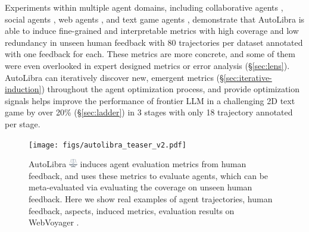 Experiments within multiple agent domains, including collaborative agents \citep{shao2024collaborative},
social agents \citep{zhousotopia}, web agents \citep{zhouwebarena,he2024webvoyager},
and text game agents \citep{paglieri2024balrog,cloos2024babaaibreakrules}, demonstrate
that AutoLibra is able to induce fine-grained and interpretable metrics with high
coverage and low redundancy in unseen human feedback with 80 trajectories per dataset
annotated with one feedback for each. These metrics are more concrete, and some of
them were even overlooked in expert designed metrics or error analysis (\S\ref{sec:lens}).
AutoLibra can iteratively discover new, emergent metrics (\S\ref{sec:iterative-induction})
throughout the agent optimization process, and provide optimization signals
helps improve the performance of frontier LLM in a challenging 2D text game by
over 20\% (\S\ref{sec:ladder}) in 3 stages with only 18 trajectory annotated per
stage.

%

\begin{figure}[p]
	\centering
	\texttt{[image: figs/autolibra\_teaser\_v2.pdf]}
	\caption{AutoLibra \protect
	\includegraphics[height=1em]{figs/scale.png}
	induces agent evaluation metrics from human feedback, and uses these metrics to
	evaluate agents, which can be meta-evaluated via evaluating the coverage on
	unseen human feedback. Here we show real examples of agent trajectories, human
	feedback, aspects, induced metrics, evaluation results on WebVoyager \citep{he2024webvoyager}.
	\vspace{-20pt}
	}
	\label{fig:teaser}
\end{figure}